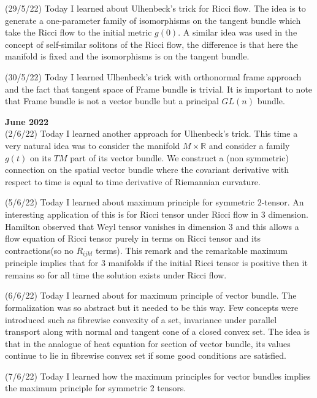 \documentclass[12pt,a4paper]{article}
\newcommand{\R}{\mathbb{R}}
\begin{document}
	(29/5/22) Today I learned about Ulhenbeck's trick for Ricci flow. The idea is to generate a one-parameter family of isomorphisms on the tangent bundle which take the Ricci flow to the initial metric $g(0)$. A similar idea was used in the concept of self-similar solitons of the Ricci flow, the difference is that here the manifold is fixed and the isomorphisms is on the tangent bundle.
	
	(30/5/22) Today I learned Ulhenbeck's trick with orthonormal frame approach and the fact that tangent space of Frame bundle is trivial. It is important to note that Frame bundle is not a vector bundle but a principal $GL(n)$ bundle.\\
		
	\maketitle\textbf{June 2022}
	\\
	
	(2/6/22) Today I learned another approach for Ulhenbeck's trick. This time a very natural idea was to consider the manifold $M \times \R$ and consider a family $g(t)$ on its $TM$ part of its vector bundle. We construct a (non symmetric) connection on the spatial vector bundle where the covariant derivative with respect to time is equal to time derivative of Riemannian curvature.
	
	(5/6/22) Today I learned about maximum principle for symmetric $2$-tensor. An interesting application of this is for Ricci tensor under Ricci flow in $3$ dimension. Hamilton observed that Weyl tensor vanishes in dimension $3$ and this allows a flow equation of Ricci tensor purely in terms on Ricci tensor and its contractions(so no $R_{ijkl}$ terms). This remark and the remarkable maximum principle implies that for $3$ manifolds if the initial Ricci tensor is positive then it remains so for all time the solution exists under Ricci flow.
	
	(6/6/22) Today I learned about for maximum principle of vector bundle. The formalization was so abstract but it needed to be this way. Few concepts were introduced such as fibrewise convexity of a set, invariance under parallel transport along with normal and tangent cone of a closed convex set. The idea is that in the analogue of heat equation for section of vector bundle, its values continue to lie in fibrewise convex set if some good conditions are satisfied.
	
	(7/6/22) Today I learned how the maximum principles for vector bundles implies the maximum principle for symmetric 2 tensors.
	
\end{document}
